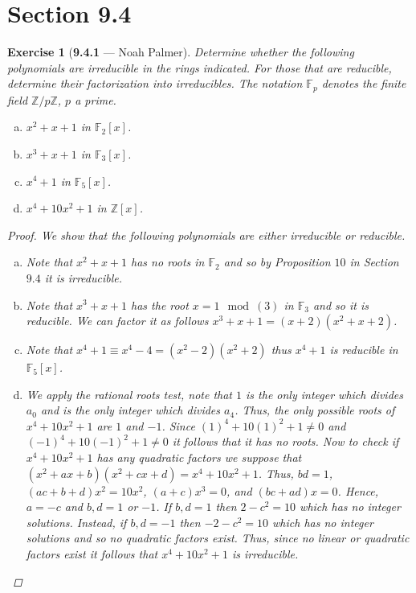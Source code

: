 \documentclass[12pt]{amsart}
\newtheorem{exercise}[theorem]{Exercise}
\theoremstyle{remark}
\newcommand{\ZZ}{{\mathbb Z}}
\newcommand{\FF}{{\mathbb F}}
\theoremstyle{mycomment}
\begin{document}
\section*{Section 9.4}
\begin{exercise}[\textbf{9.4.1} --- Noah Palmer] Determine whether the following polynomials are irreducible in the rings indicated. For those that are reducible, determine their factorization into irreducibles. The notation $\FF_p$ denotes the finite field $\ZZ/p\ZZ$, $p$ a prime.
  \begin{enumerate}[(a)]
  \item $x^2+x+1$ in $\FF_2[x]$.
  \item $x^3+x+1$ in $\FF_3[x]$.
  \item $x^4+1$ in $\FF_5[x]$.
  \item $x^4+10x^2+1$ in $\ZZ[x]$.
  \end{enumerate}
  \begin{proof}We show that the following polynomials are either irreducible or reducible.
  \begin{enumerate}[(a)]
  \item Note that $x^2+x+1$ has no roots in $\FF_2$ and so by Proposition $10$ in Section $9.4$ it is irreducible.
  \item Note that $x^3+x+1$ has the root $x=1\mod(3)$ in $\FF_3$ and so it is reducible. We can factor it as follows $x^3+x+1=(x+2)(x^2+x+2)$.
  \item Note that $x^4+1\equiv x^4-4=(x^2-2)(x^2+2)$ thus $x^4+1$ is reducible in $\FF_5[x]$. 
  \item We apply the rational roots test, note that $1$ is the only integer which divides $a_0$ and is the only integer which divides $a_4$. Thus, the only possible roots of $x^4+10x^2+1$ are $1$ and $-1$. Since $(1)^4+10(1)^2+1\neq 0$ and $(-1)^4+10(-1)^2+1\neq 0$ it follows that it has no roots. Now to check if $x^4+10x^2+1$ has any quadratic factors we suppose that $(x^2+ax+b)(x^2+cx+d)=x^4+10x^2+1$. Thus, $bd=1$, $(ac+b+d)x^2=10x^2$, $(a+c)x^3=0$, and $(bc+ad)x=0$. Hence, $a=-c$ and $b,d=1$ or $-1$. If $b,d=1$ then $2-c^2=10$ which has no integer solutions. Instead, if $b,d=-1$ then $-2-c^2=10$ which has no integer solutions and so no quadratic factors exist. Thus, since no linear or quadratic factors exist it follows that $x^4+10x^2+1$ is irreducible.
  \end{enumerate}
  \end{proof}
  \end{exercise}
  \vspace{.15in}
\end{document}
